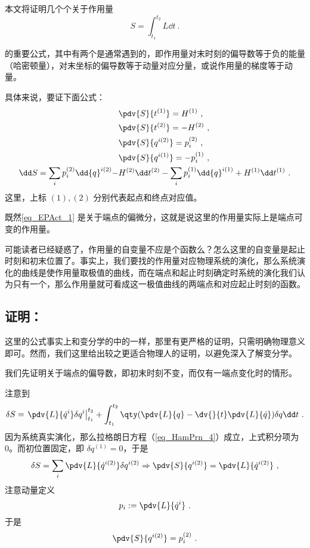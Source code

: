 
本文将证明几个个关于作用量
\begin{equation}
S=\int_{t_1}^{t_2}L\dd t~.
\end{equation}

的重要公式，其中有两个是通常遇到的，即作用量对末时刻的偏导数等于负的能量（哈密顿量），对末坐标的偏导数等于动量对应分量，或说作用量的梯度等于动量。

具体来说，要证下面公式：
\begin{equation}\label{eq_EPAct_1}
\begin{aligned}
&\pdv{S}{t^{(1)}}=H^{(1)}~,\\
&\pdv{S}{t^{(2)}}=-H^{(2)}~,\\
&\pdv{S}{{q}^{i(2)}}=p_i^{(2)}~,\\
&\pdv{S}{{q}^{i (1)}}=-p_i^{(1)}~,\\
\dd S=\sum_i p_i^{(2)}\dd {q}^{i (2)}-&H^{(2)}\dd t^{(2)}-\sum_i p_i^{(1)}\dd {q}^{i (1)}+H^{(1)}\dd t^{(1)}~.
\end{aligned}
\end{equation}
这里，上标 $(1),(2)$ 分别代表起点和终点对应值。

既然\autoref{eq_EPAct_1} 是关于端点的偏微分，这就是说这里的作用量实际上是端点可变的作用量。

可能读者已经疑惑了，作用量的自变量不应是个函数么？怎么这里的自变量是起止时刻和初末位置了。事实上，我们要找的作用量对应物理系统的演化，那么系统演化的曲线是使作用量取极值的曲线，而在端点和起止时刻确定时系统的演化我们认为只有一个，那么作用量就可看成这一极值曲线的两端点和对应起止时刻的函数。
\subsection{证明：}
这里的公式事实上和变分学的中的一样，那里有更严格的证明，只需明确物理意义即可。然而，我们这里给出较之更适合物理人的证明，以避免深入了解变分学。

我们先证明关于端点的偏导数，即初末时刻不变，而仅有一端点变化时的情形。

注意到
\begin{equation}
\delta S=\left.\pdv{L}{\dot q^i}\delta q^i\right|_{t_1}^{t_2}+\int_{t_1}^{t_2}\qty(\pdv{L}{q}-\dv{}{t}\pdv{L}{\dot q})\delta q\dd t~.
\end{equation}
因为系统真实演化，那么拉格朗日方程（\autoref{eq_HamPrn_4}）成立，上式积分项为0。而初位置固定，即 $\delta q^{(1)}=0$，于是
\begin{equation}
\delta S=\sum_i\pdv{L}{{\dot q}^{i (2)}}\delta {q}^{i (2)}\Rightarrow \pdv{S}{{q}^{i (2)}}=\pdv{L}{{\dot q}^{i (2)}}~,
\end{equation}
注意动量定义
\begin{equation}
p_i:=\pdv{L}{\dot q^i}~.
\end{equation}
于是
\begin{equation}
\pdv{S}{{q}^{i (2)}}=p_i^{(2)}~.
\end{equation}

